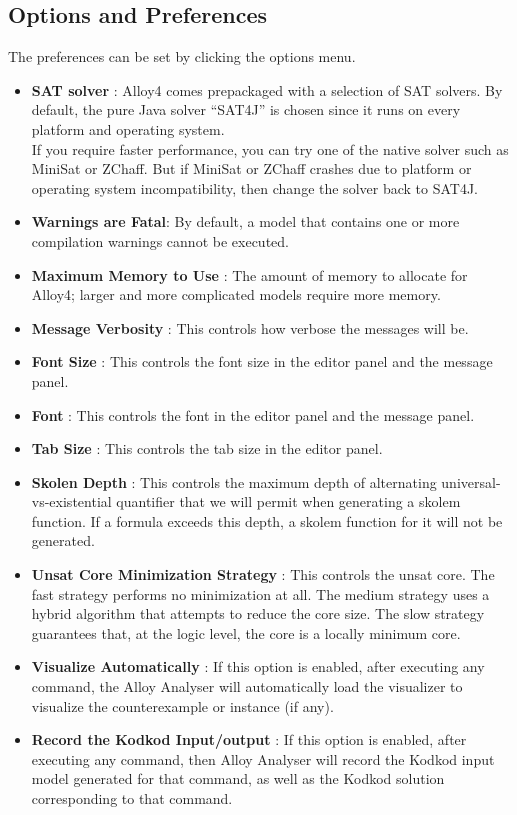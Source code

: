 \documentclass[a4paper,12pt]{extarticle}
\begin{document}
\subsection{Options and Preferences}
\label{Options & Preference}
The preferences can be set by clicking the options menu.
\begin{itemize}
\item \textbf{SAT solver} : Alloy4 comes prepackaged with a selection of SAT solvers. By default, the pure Java solver “SAT4J” is chosen since it runs on every platform and operating system.\\
If you require faster performance, you can try one of the native solver such as MiniSat or ZChaff. But if MiniSat or ZChaff crashes due to platform or operating system incompatibility, then change the solver back to SAT4J.
\item \textbf{Warnings are Fatal}: By default, a model that contains one or more compilation warnings cannot be executed.
\item \textbf{Maximum Memory to Use} : The amount of memory to allocate for Alloy4; larger and more complicated models require more memory.
\item \textbf{Message Verbosity} : This controls how verbose the messages will be.
\item \textbf{Font Size} : This controls the font size in the editor panel and the message panel.
\item \textbf{Font} : This controls the font in the editor panel and the message panel.
\item \textbf{Tab Size} : This controls the tab size in the editor panel.
\item \textbf{Skolen Depth} : This controls the maximum depth of alternating universal-vs-existential quantifier that we will permit when generating a skolem function. If a formula exceeds this depth, a skolem function for it will not be generated.
\item \textbf{Unsat Core Minimization Strategy} : This controls the unsat core. The fast strategy performs no minimization at all. The medium strategy uses a hybrid algorithm that attempts to reduce the core size. The slow strategy guarantees that, at the logic level, the core is a locally minimum core.
\item \textbf{Visualize Automatically} : If this option is enabled, after executing any command, the Alloy Analyser will automatically load the visualizer to visualize the counterexample or instance (if any).
\item \textbf{Record the Kodkod Input/output} : If this option is enabled, after executing any command, then Alloy Analyser will record the Kodkod input model generated for that command, as well as the Kodkod solution corresponding to that command.
\end{itemize}
\end{document}
